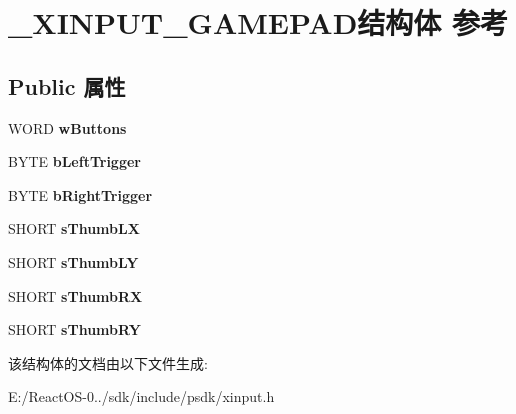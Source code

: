 \hypertarget{struct___x_i_n_p_u_t___g_a_m_e_p_a_d}{}\section{\+\_\+\+X\+I\+N\+P\+U\+T\+\_\+\+G\+A\+M\+E\+P\+A\+D结构体 参考}
\label{struct___x_i_n_p_u_t___g_a_m_e_p_a_d}
\subsection*{Public 属性}
\begin{DoxyCompactItemize}
\item 
\mbox{\label{struct___x_i_n_p_u_t___g_a_m_e_p_a_d_aa67905941abea0fac79e57b4fb8b5124}} 
W\+O\+RD {\bfseries w\+Buttons}
\item 
\mbox{\label{struct___x_i_n_p_u_t___g_a_m_e_p_a_d_a50480b9dd5f9d0f5db9d47358c66b0da}} 
B\+Y\+TE {\bfseries b\+Left\+Trigger}
\item 
\mbox{\label{struct___x_i_n_p_u_t___g_a_m_e_p_a_d_a065347fca7403ff5c399b21af5a0e1f3}} 
B\+Y\+TE {\bfseries b\+Right\+Trigger}
\item 
\mbox{\label{struct___x_i_n_p_u_t___g_a_m_e_p_a_d_acab2d1e1bda5277f4cbd9abdf6b82066}} 
S\+H\+O\+RT {\bfseries s\+Thumb\+LX}
\item 
\mbox{\label{struct___x_i_n_p_u_t___g_a_m_e_p_a_d_ad0c91ee8c26e828438bacb475f9c5ec3}} 
S\+H\+O\+RT {\bfseries s\+Thumb\+LY}
\item 
\mbox{\label{struct___x_i_n_p_u_t___g_a_m_e_p_a_d_ae6c4c141613af0574fc86a40fdf14405}} 
S\+H\+O\+RT {\bfseries s\+Thumb\+RX}
\item 
\mbox{\label{struct___x_i_n_p_u_t___g_a_m_e_p_a_d_a89660a58eda7e822d44abbe1af7aea3b}} 
S\+H\+O\+RT {\bfseries s\+Thumb\+RY}
\end{DoxyCompactItemize}


该结构体的文档由以下文件生成\+:\begin{DoxyCompactItemize}
\item 
E\+:/\+React\+O\+S-\/0../sdk/include/psdk/xinput.\+h\end{DoxyCompactItemize}
